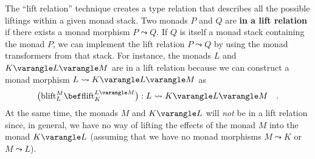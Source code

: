 The \textsf{``}lift
relation\textsf{''} technique creates a type relation that describes all the
possible liftings within a given monad stack. Two monads $P$ and
$Q$ are \textbf{in a lift relation} if there exists a monad morphism
$P\leadsto Q$. If $Q$ is itself a monad stack containing the monad
$P$, we can implement the lift relation $P\leadsto Q$ by using the
monad transformers from that stack. For instance, the monads $L$
and $K\varangle L\varangle M$ are in a lift relation because we can
construct a monad morphism $L\leadsto K\varangle L\varangle M$ as
\[
\big(\text{blift}_{L}^{M}\bef\text{flift}_{K}^{L\varangle M}\big):L\leadsto K\varangle L\varangle M\quad.
\]
At the same time, the monads $M$ and $K\varangle L$ will \emph{not}
be in a lift relation since, in general, we have no way of lifting
the effects of the monad $M$ into the monad $K\varangle L$ (assuming
that we have no monad morphisms $M\leadsto K$ or $M\leadsto L$).

